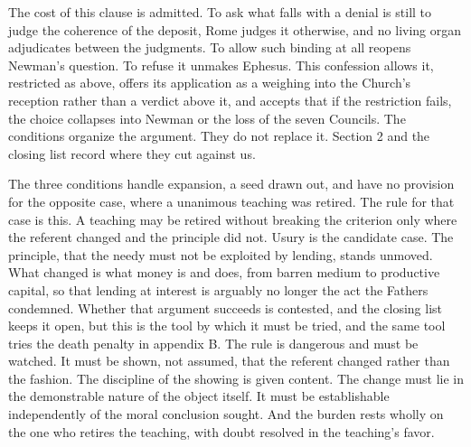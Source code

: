 \documentclass[11pt,twoside]{article}
\newcommand{\unit}[1]{\needspace{3\baselineskip}\par\medskip{\normalfont\bfseries\color{subhead}#1}\par\nobreak\smallskip}
\begin{document}
The cost of this clause is admitted. To ask what falls with a denial is still to judge the coherence of the deposit, Rome judges it otherwise, and no living organ adjudicates between the judgments. To allow such binding at all reopens Newman's question. To refuse it unmakes Ephesus. This confession allows it, restricted as above, offers its application as a weighing into the Church's reception rather than a verdict above it, and accepts that if the restriction fails, the choice collapses into Newman or the loss of the seven Councils. The conditions organize the argument. They do not replace it. Section 2 and the closing list record where they cut against us.

\unit{The rule of retraction.}
The three conditions handle expansion, a seed drawn out, and have no provision for the opposite case, where a unanimous teaching was retired. The rule for that case is this. A teaching may be retired without breaking the criterion only where the referent changed and the principle did not. Usury is the candidate case. The principle, that the needy must not be exploited by lending, stands unmoved. What changed is what money is and does, from barren medium to productive capital, so that lending at interest is arguably no longer the act the Fathers condemned. Whether that argument succeeds is contested, and the closing list keeps it open, but this is the tool by which it must be tried, and the same tool tries the death penalty in appendix B. The rule is dangerous and must be watched. It must be shown, not assumed, that the referent changed rather than the fashion. The discipline of the showing is given content. The change must lie in the demonstrable nature of the object itself. It must be establishable independently of the moral conclusion sought. And the burden rests wholly on the one who retires the teaching, with doubt resolved in the teaching's favor.
\end{document}
